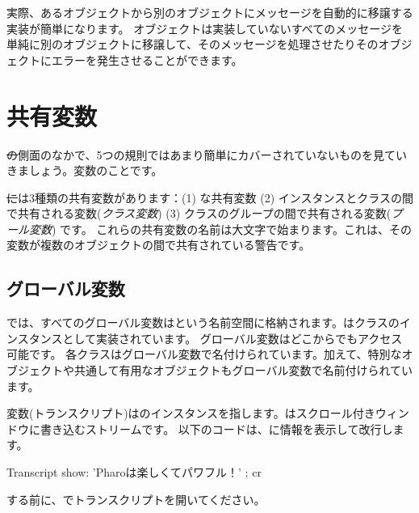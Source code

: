 \documentclass[a4paper,10pt,twoside]{book}
\begin{document}
実際、あるオブジェクトから別のオブジェクトにメッセージを自動的に移譲する実装が簡単になります。
オブジェクトは実装していないすべてのメッセージを単純に別のオブジェクトに移譲して、そのメッセージを処理させたりそのオブジェクトにエラーを発生させることができます。

\section{共有変数}

\st の側面のなかで、5つの規則ではあまり簡単にカバーされていないものを見ていきましょう。変数のことです。

\st には3種類の共有変数があります：(1) な共有変数 (2) インスタンスとクラスの間で共有される変数(\emph{クラス変数}) (3) クラスのグループの間で共有される変数(\emph{プール変数}) です。
これらの共有変数の名前は大文字で始まります。これは、その変数が複数のオブジェクトの間で共有されている警告です。

\subsection{グローバル変数}
\pharo では、すべてのグローバル変数はという名前空間に格納されます。はクラスのインスタンスとして実装されています。
グローバル変数はどこからでもアクセス可能です。
各クラスはグローバル変数で名付けられています。加えて、特別なオブジェクトや共通して有用なオブジェクトもグローバル変数で名前付けられています。

変数(トランスクリプト)はのインスタンスを指します。はスクロール付きウィンドウに書き込むストリームです。
以下のコードは、に情報を表示して改行します。

\begin{code}{}
Transcript show: 'Pharoは楽しくてパワフル！' ; cr
\end{code}

\noindent
{}する前に、でトランスクリプトを開いてください。

\end{document}
